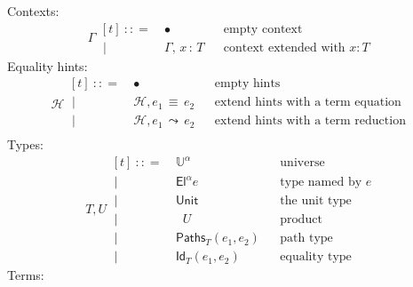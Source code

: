 \documentclass{article}
\newcommand{\G}{\Gamma} %
\newcommand{\T}{T} %
\newcommand{\U}{U} %
\newcommand{\x}{x} %
\newcommand{\e}{e} %
\newcommand{\bnf}{\ \mathrel{{:}{:}{=}}\ }
\newcommand{\bnfor}{\ \mid\ \ }
\newcommand{\ctxempty}{\bullet} %
\newcommand{\ctxextend}[3]{#1,\, #2\, {:}\, #3} %
\newcommand{\Universe}[1]{\mathbb{U}^{#1}} %
\newcommand{\El}[2]{\mathsf{El}^{#1} #2} %
\newcommand{\Unit}{\mathsf{Unit}} %
\newcommand{\Prod}[2]{\mathop{\textstyle\prod_{(#1 {:} #2)}}} %
\newcommand{\PrEqual}[3]{\mathsf{Paths}_{#1}(#2,#3)} %
\newcommand{\JuEqual}[3]{\mathsf{Id}_{#1}(#2,#3)} %
\newcommand{\eqtermhint}[2]{#1 \,{\equiv}\, #2 } %
\newcommand{\redtermhint}[2]{#1 \,{\leadsto}\, #2 } %
\renewcommand{\H}{\mathcal{H}}      %
\newcommand{\addhinteq}[3]{#1, \eqtermhint{#2}{#3}} %
\newcommand{\addhintred}[3]{#1, \redtermhint{#2}{#3}} %
\begin{document}
Contexts:
%
\begin{equation*}
  \G
  \begin{aligned}[t]
    \bnf   {}& \ctxempty & & \text{empty context}\\
    \bnfor {}& \ctxextend{\G}{\x}{\T} & & \text{context extended with $x : T$}
  \end{aligned}
\end{equation*}
%
Equality hints:
%
\begin{equation*}
  \H
  \begin{aligned}[t]
    \bnf   {}& \ctxempty & & \text{empty hints}\\
    \bnfor {}& \addhinteq{\H}{\e_1}{\e_2} & & \text{extend hints with a term equation} \\
    \bnfor {}& \addhintred{\H}{\e_1}{\e_2} & & \text{extend hints with a term reduction} \\
  \end{aligned}
\end{equation*}
%
Types:
%
\begin{equation*}
  \T, \U
  \begin{aligned}[t]
    \bnf   {}& \Universe{\alpha} & & \text{universe}\\
    \bnfor {}& \El{\alpha}{\e} & & \text{type named by $e$}\\
    \bnfor {}& \Unit & & \text{the unit type}\\
    \bnfor {}& \Prod{x}{\T} \U & & \text{product}\\
    \bnfor {}& \PrEqual{T}{\e_1}{\e_2} & & \text{path type}\\
    \bnfor {}& \JuEqual{T}{\e_1}{\e_2} & & \text{equality type}
  \end{aligned}
\end{equation*}
%
Terms:
%
\end{document}
